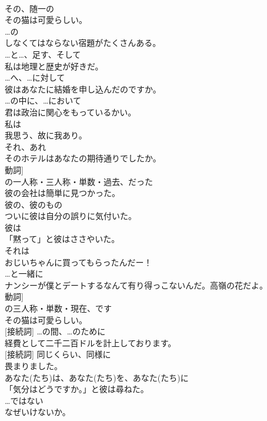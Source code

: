 \documentclass[8pt]{extreport}
\begin{document}
\begin{CJK}{UTF8}{min}
\\	[冠詞]	その、随一の	
\\	その猫は可愛らしい。	
\\	[前置詞]	…の	
\\	しなくてはならない宿題がたくさんある。	
\\	[接続詞]	…と…、足す、そして	
\\	私は地理と歴史が好きだ。	
\\	[前置詞]	…へ、…に対して	
\\	彼はあなたに結婚を申し込んだのですか。	
\\	[前置詞]	…の中に、…において	
\\	君は政治に関心をもっているかい。	
\\	[代名詞]	私は	
\\	我思う、故に我あり。	
\\	[代名詞]	それ、あれ	
\\	そのホテルはあなたの期待通りでしたか。	
\\	動詞]	
\\	の一人称・三人称・単数・過去、だった	
\\	彼の会社は簡単に見つかった。	
\\	[限定詞]	彼の、彼のもの	
\\	ついに彼は自分の誤りに気付いた。	
\\	[代名詞]	彼は	
\\	「黙って」と彼はささやいた。	
\\	[代名詞]	それは	
\\	おじいちゃんに買ってもらったんだー！	
\\	[前置詞]	…と一緒に	
\\	ナンシーが僕とデートするなんて有り得っこないんだ。高嶺の花だよ。	
\\	動詞]	
\\	の三人称・単数・現在、です	
\\	その猫は可愛らしい。	
\\	[前置詞] [接続詞]	…の間、…のために	
\\	経費として二千二百ドルを計上しております。	
\\	[副詞] [接続詞]	同じくらい、同様に	
\\	畏まりました。	
\\	[代名詞]	あなた(たち)は、あなた(たち)を、あなた(たち)に	
\\	「気分はどうですか。」と彼は尋ねた。	
\\	[副詞]	…ではない	
\\	なぜいけないか。	

\end{CJK}
\end{document}

